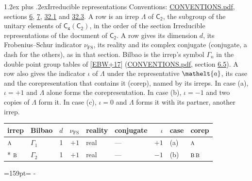 \documentclass[10pt,a4paper]{article}
\makeatletter
\renewcommand\section{\@startsection{section}{1}{\z@}{-3ex plus -1ex minus -.2ex}%
  {1.2ex plus .2ex}{\normalfont\large\sffamily\bfseries\color{parttitle}}}
\newcommand{\needspace}[1]{\par\penalty-100\begingroup\dimen0=#1\relax\dimen2=\pagegoal
  \advance\dimen2-\pagetotal\ifdim\dimen0>\dimen2\relax\ifdim\dimen2>0pt\vfil\break\fi\fi
  \endgroup}
\numberwithin{equation}{section}
\newcommand{\eltfont}[1]{{\let\sigma\eltsigma\mathelt{#1}}}
\newcommand{\grp}[1]{\mathsf{#1}}
\newcommand{\irr}[1]{\text{\normalfont\scshape #1}}
\newcommand{\elt}[1]{\eltfont{#1}}
\newcommand{\fsind}{\nu_{\mathrm{FS}}}
\makeatother
\begin{document}
\section{Irreducible representations}\label{s:irreps}
Conventions: \href{../../CONVENTIONS.pdf}{CONVENTIONS.pdf}, sections \href{../../../rotation/CONVENTIONS.pdf\#conv.6}{6}, \href{../../../rotation/CONVENTIONS.pdf\#conv.7}{7}, \href{../../CONVENTIONS.pdf\#conv.32.1}{32.1} and \href{../../CONVENTIONS.pdf\#conv.32.3}{32.3}.
\leavevmode\label{n:irrep.Delta}A row is an irrep $\Lambda$ of $\grp{C_{2}}$, the subgroup of the unitary elements of $\grp{C_{4}}(\grp{C_{2}})$, in the order of the section Irreducible representations of the document of \href{../../../rotation/data/pdf/C2.pdf}{$\grp{C_{2}}$}. \label{n:index.dimension}\label{n:index.frobenius}\label{n:head.irrep}\label{n:head.reality}\label{n:head.conjugate}A row gives its dimension $d$, its Frobenius--Schur indicator $\fsind$, its reality and its complex conjugate (conjugate, a dash for the others), as in that section. \label{n:head.bilbao}\label{n:irrep.alias.gamma}Bilbao is the irrep's symbol $\Gamma_n$ in the double point group tables of [\href{../../../REFERENCES.pdf\#ref.EBW+17}{EBW+17}] (\href{../../CONVENTIONS.pdf}{CONVENTIONS.pdf}, section \href{../../../rotation/CONVENTIONS.pdf\#conv.6.5}{6.5}). \label{n:head.case.corep}\label{n:head.corep}A row also gives the indicator $\iota$ of $\Lambda$ under the representative $\elt{a}$, its case and the corepresentation that contains it (corep), named by its irreps. In case (a), $\iota = +1$ and $\Lambda$ alone forms the corepresentation. In case (b), $\iota = -1$ and two copies of $\Lambda$ form it. In case (c), $\iota = 0$ and $\Lambda$ forms it with its partner, another irrep.
\setlength{\emergencystretch}{2em}\par\setlength{\emergencystretch}{0pt}
{\small\renewcommand{\arraystretch}{1.25}\setlength{\tabcolsep}{4pt}\begin{longtable}{@{}llrrllrll@{}}\toprule
irrep & Bilbao & $d$ & $\fsind$ & reality & conjugate & $\iota$ & case & corep\\\midrule\endhead
\bottomrule\endfoot\endlastfoot
$\irr{a}$ & $\Gamma_{1}$ & 1 & $+1$ & real & --- & $+1$ & (a) & $\irr{a}$\\*
$\irr{b}$ & $\Gamma_{2}$ & 1 & $+1$ & real & --- & $-1$ & (b) & $\irr{b}\,\irr{b}$\\
\bottomrule\end{longtable}}
\needspace{159pt}
\end{document}
